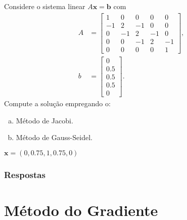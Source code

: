 \begin{exer}
  Considere o sistema linear $A\pmb{x} = \pmb{b}$ com
  \begin{align}
    A &=
        \begin{bmatrix}
          1& 0& 0& 0& 0\\
          -1& 2& -1& 0& 0\\
          0& -1& 2& -1& 0\\
          0& 0& -1& 2& -1\\
          0& 0& 0& 0& 1
        \end{bmatrix},\\
    b &=
        \begin{bmatrix}
          0\\
          0.5\\
          0.5\\
          0.5\\
          0
        \end{bmatrix}.
  \end{align}
  Compute a solução empregando o:
  \begin{enumerate}[a)]
  \item Método de Jacobi.
  \item Método de Gauss-Seidel.
  \end{enumerate}
\end{exer}
\begin{resp}
  $\pmb{x} = (0, 0.75, 1, 0.75, 0)$
\end{resp}

\ifisbook
\subsubsection{Respostas}
\shipoutAnswer
\fi


\section{Método do Gradiente}\label{cap_sislin_sec_metg}

